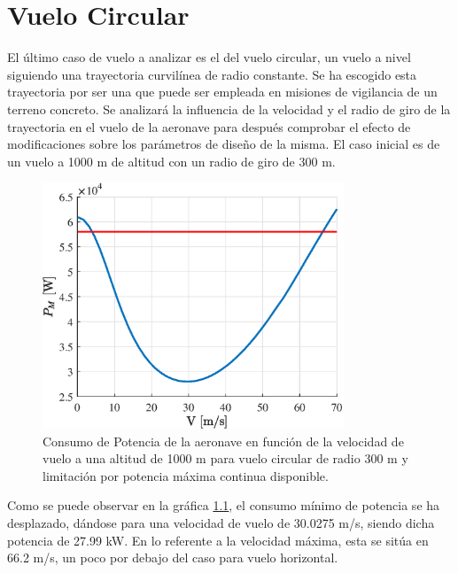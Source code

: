 \chapter{Vuelo Circular}

El último caso de vuelo a analizar es el del vuelo circular, un vuelo a nivel siguiendo una trayectoria curvilínea de radio constante. Se ha escogido esta trayectoria por ser una que puede ser empleada en misiones de vigilancia de un terreno concreto. 
Se analizará la influencia de la velocidad y el radio de giro de la trayectoria en el vuelo de la aeronave para después comprobar el efecto de modificaciones sobre los parámetros de diseño de la misma. El caso inicial es de un vuelo a 1000 m de altitud con un radio de giro de 300 m. 

\begin{figure}
	\centering
	\includegraphics[width=90mm]{graficos/PMVC}
	\caption{Consumo de Potencia de la aeronave en función de la velocidad de vuelo a una altitud de 1000 m para vuelo circular de radio 300 m y limitación por potencia máxima continua disponible.}
	\label{PMVC}
\end{figure}

Como se puede observar en la gráfica \ref{PMVC}, el consumo mínimo de potencia se ha desplazado, dándose para una velocidad de vuelo de 30.0275 m/s, siendo dicha potencia de 27.99 kW. En lo referente a la velocidad máxima, esta se sitúa en 66.2 m/s, un poco por debajo del caso para vuelo horizontal.

